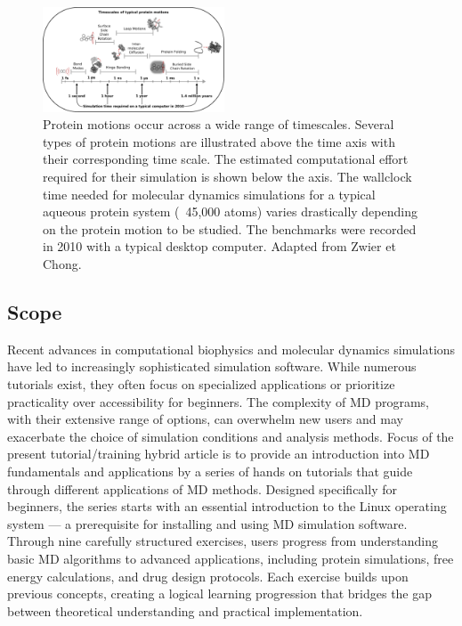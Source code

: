 \documentclass[9pt,tutorial]{livecoms}
\begin{document}
\begin{figure}
    \centering
    \includegraphics[width=0.48\textwidth]{figures/timescales.pdf}
    \caption{Protein motions occur across a wide range of timescales. Several types of protein motions are illustrated above the time axis with their corresponding time scale. The estimated computational effort required for their simulation is shown below the axis. The wallclock time needed for molecular dynamics simulations for a typical aqueous protein system (~45,000 atoms) varies drastically depending on the protein motion to be studied. The benchmarks were recorded in 2010 with a typical desktop computer. Adapted from Zwier et Chong.\cite{Zwier2010}}
    \label{fig:timescales}
\end{figure}


\subsection{Scope}
Recent advances in computational biophysics and molecular dynamics simulations have led to increasingly sophisticated simulation software. While numerous tutorials exist, they often focus on specialized applications or prioritize practicality over accessibility for beginners. The complexity of MD programs, with their extensive range of options, can overwhelm new users and may exacerbate the choice of simulation conditions and analysis methods. Focus of the present tutorial/training hybrid article is to provide an introduction into MD fundamentals and applications by a series of hands on tutorials that guide through different applications of MD methods. Designed specifically for beginners, the series starts with an essential introduction to the Linux operating system — a prerequisite for installing and using MD simulation software. Through nine carefully structured exercises, users progress from understanding basic MD algorithms to advanced applications, including protein simulations, free energy calculations, and drug design protocols. Each exercise builds upon previous concepts, creating a logical learning progression that bridges the gap between theoretical understanding and practical implementation.\\
\end{document}
